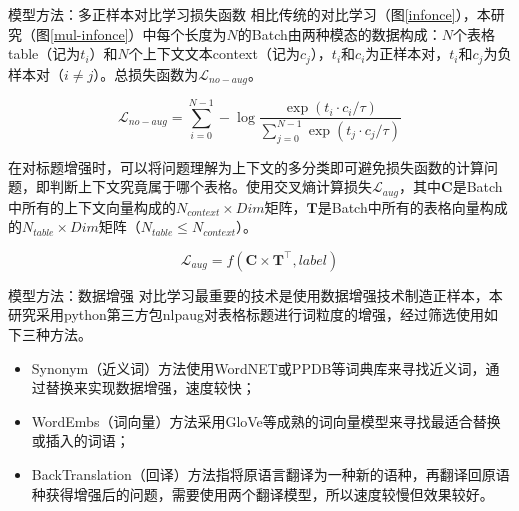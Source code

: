 \documentclass[final,hyperref={pdfpagelabels=false}]{ctexbeamer}
\begin{document}
\begin{frame}[t]
\begin{columns}[t]
\begin{column}{.3\textwidth}
\begin{block}{模型方法：多正样本对比学习损失函数}
      \vspace{4mm}
      相比传统的对比学习（图\ref{infonce}），本研究（图\ref{mul-infonce}）中每个长度为$N$的Batch由两种模态的数据构成：$N$个表格table（记为$t_i$）和$N$个上下文文本context（记为$c_j$），$t_i$和$c_i$为正样本对，$t_i$和$c_j$为负样本对（$i \neq j$）。总损失函数为$\mathcal{L}_{no-aug}$。
      \begin{footnotesize}
      \begin{equation}
          \label{eq:loss_noaug}
          \mathcal{L}_{no-aug} = \sum_{i=0}^{N-1} -\log \dfrac{\exp \left(t_i \cdot c_i / \tau\right)}{\sum_{j=0}^{N-1} \exp \left(t_j \cdot c_{j} / \tau\right)}
      \end{equation}
      \end{footnotesize}

      \vspace{4mm}
      在对标题增强时，可以将问题理解为上下文的多分类即可避免损失函数的计算问题，即判断上下文究竟属于哪个表格。使用交叉熵计算损失$\mathcal{L}_{aug}$，其中$\mathbf{C}$是Batch中所有的上下文向量构成的$N_{context} \times Dim$矩阵，$\mathbf{T}$是Batch中所有的表格向量构成的$N_{table} \times Dim$矩阵（$N_{table} \leq N_{context}$）。
      \begin{footnotesize}
      \begin{equation}
          \label{eq:loss_aug}
          \mathcal{L}_{aug} = f \left (\mathbf{C} \times \mathbf{T}^\top, label \right )
      \end{equation}
      \end{footnotesize}
      \vspace{-18mm}
    \end{block}

    \begin{block}{模型方法：数据增强}
      对比学习最重要的技术是使用数据增强技术制造正样本，本研究采用python第三方包nlpaug对表格标题进行词粒度的增强，经过筛选使用如下三种方法。
      \begin{itemize}
          \item Synonym（近义词）方法使用WordNET或PPDB等词典库来寻找近义词，通过替换来实现数据增强，速度较快；
          \item WordEmbs（词向量）方法采用GloVe等成熟的词向量模型来寻找最适合替换或插入的词语；
          \item BackTranslation（回译）方法指将原语言翻译为一种新的语种，再翻译回原语种获得增强后的问题，需要使用两个翻译模型，所以速度较慢但效果较好。
      \end{itemize}
    \end{block}
  \end{column} %


\end{columns}
\end{frame}
\end{document}
